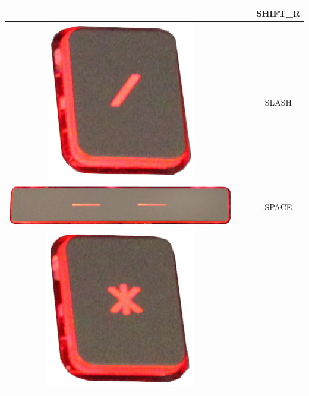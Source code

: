 \begin{longtable}{cccc}
\begin{minipage}[c]{.3\textwidth}
\vspace{0.2cm}
\end{minipage} & & & SHIFT\_R\\
\hline
\begin{minipage}[c]{.3\textwidth}
\vspace{0.2cm}
\includegraphics[scale=0.1]{Images/KeyMapping/SLASH}
\vspace{0.2cm}
\end{minipage} & & & SLASH\\
\hline
\begin{minipage}[c]{.3\textwidth}
\vspace{0.2cm}
\includegraphics[scale=0.1]{Images/KeyMapping/SPACE}
\vspace{0.2cm}
\end{minipage} & & & SPACE\\
\hline
\begin{minipage}[c]{.3\textwidth}
\vspace{0.2cm}
\includegraphics[scale=0.1]{Images/KeyMapping/STAR}

\end{minipage}
\end{longtable}
